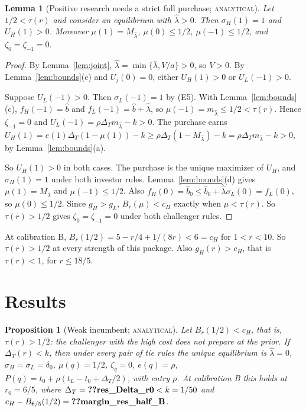 \documentclass[12pt]{article}
\newtheorem{proposition}{Proposition}
\newtheorem{lemma}{Lemma}
\theoremstyle{definition}
\theoremstyle{remark}
\newcommand{\DT}{\Delta_T}
\newcommand{\lh}{\hat\lambda}
\newcommand{\lb}{\bar\lambda}
\newcommand{\st}[1]{\textsc{#1}}
\begin{document}
\begin{lemma}[Positive research needs a strict full purchase; \st{analytical}]\label{lem:buy}
Let $1/2<\tau(r)$ and consider an equilibrium with $\lh>0$. Then $\sigma_H(1)=1$ and $U_H(1)>0$. Moreover
$\mu(1)=M_{\lh}$, $\mu(0)\le1/2$, $\mu(-1)\le1/2$, and $\zeta_0=\zeta_{-1}=0$.
\end{lemma}

\begin{proof}
By Lemma~\ref{lem:joint}, $\lh=\min\{\lb,V/a\}>0$, so $V>0$. By Lemma~\ref{lem:bounds}(c) and $U_j(0)=0$, either
$U_H(1)>0$ or $U_L(-1)>0$.

Suppose $U_L(-1)>0$. Then $\sigma_L(-1)=1$ by (E5). With Lemma~\ref{lem:bounds}(c), $f_H(-1)=\hat b$ and
$f_L(-1)=\hat b+\lh$, so $\mu(-1)=m_{\lh}\le1/2<\tau(r)$. Hence $\zeta_{-1}=0$ and
$U_L(-1)=\rho\DT m_{\lh}-k>0$. The purchase earns
$U_H(1)=e(1)\DT(1-\mu(1))-k\ge\rho\DT(1-M_{\lh})-k=\rho\DT m_{\lh}-k>0$, by Lemma~\ref{lem:bounds}(a).

So $U_H(1)>0$ in both cases. The purchase is the unique maximizer of $U_H$, and $\sigma_H(1)=1$ under both investor
rules. Lemma~\ref{lem:bounds}(d) gives $\mu(1)=M_{\lh}$ and $\mu(-1)\le1/2$. Also $f_H(0)=\hat b_0\le\hat b_0+\lh\sigma_L(0)
=f_L(0)$, so $\mu(0)\le1/2$. Since $g_H>g_L$, $B_r(\mu)<c_H$ exactly when $\mu<\tau(r)$. So $\tau(r)>1/2$ gives
$\zeta_0=\zeta_{-1}=0$ under both challenger rules.
\end{proof}

At calibration B, $B_r(1/2)=5-r/4+1/(8r)<6=c_H$ for $1<r<10$. So $\tau(r)>1/2$ at every strength of this
package. Also $g_H(r)>c_H$, that is $\tau(r)<1$, for $r\le 18/5$.

\section{Results}\label{sec:results}

\begin{proposition}[Weak incumbent; \st{analytical}]\label{prop:weak}
Let $B_r(1/2)<c_H$, that is, $\tau(r)>1/2$: the challenger with the high cost does not prepare at the prior.
If $\DT(r)<k$, then under every pair of tie rules the unique equilibrium is
$\lh=0$, $\sigma_H=\sigma_L=\delta_0$, $\mu(q)=1/2$, $\zeta_q=0$, $e(q)=\rho$, $P(q)=t_0+\rho(t_L-t_0+\DT/2)$, with
entry $\rho$. At calibration B this holds at $r_0=6/5$, where $\DT=\reg{res_Delta_r0}<k=1/50$ and
$c_H-B_{6/5}(1/2)=\reg{margin_res_half_B}$.
\end{proposition}
\end{document}
